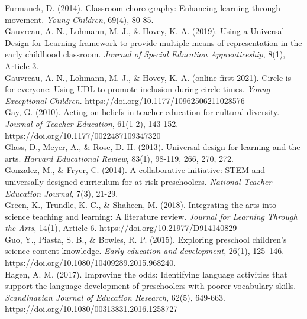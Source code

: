 \documentclass[11.5pt]{sig-alternate}
\begin{document}
Furmanek, D. (2014). Classroom choreography: Enhancing learning through movement. \textit{Young Children}, 69(4), 80-85. 
\\
\newpage
Gauvreau, A. N., Lohmann, M. J., \& Hovey, K. A. (2019). Using a Universal Design for 
Learning framework to provide multiple means of representation in the early childhood classroom. \textit{Journal of Special Education Apprenticeship}, 8(1), Article 3.
\\

Gauvreau, A. N., Lohmann, M. J., \& Hovey, K. A. (online first 2021). Circle is for everyone: 
Using UDL to promote inclusion during circle times. \textit{Young Exceptional Children}. https://doi.org/10.1177/10962506211028576 
\\

Gay, G. (2010). Acting on beliefs in teacher education for cultural diversity. \textit{Journal of 
Teacher Education}, 61(1-2), 143-152. https://doi.org/10.1177/0022487109347320 
\\

Glass, D., Meyer, A., \& Rose, D. H. (2013). Universal design for learning and the arts. \textit{Harvard 
Educational Review}, 83(1), 98-119, 266, 270, 272.
\\

Gonzalez, M., \& Fryer, C. (2014). A collaborative initiative: STEM and universally designed 
curriculum for at-risk preschoolers.\textit{ National Teacher Education Journal}, 7(3), 21-29. 
\\

Green, K., Trundle, K. C., \& Shaheen, M. (2018). Integrating the arts into science teaching and 
learning: A literature review. \textit{Journal for Learning Through the Arts}, 14(1), Article 6. https://doi.org/10.21977/D914140829 
\\

Guo, Y., Piasta, S. B., \& Bowles, R. P. (2015). Exploring preschool children's science content 
knowledge. \textit{Early education and development}, 26(1), 125–146.\\ https://doi.org/10.1080/10409289.2015.968240. 
\\

Hagen, A. M. (2017). Improving the odds: Identifying language activities that support the 
language development of preschoolers with poorer vocabulary skills. \textit{Scandinavian Journal of Education Research}, 62(5), 649-663. https://doi.org/10.1080/00313831.2016.1258727 
\\
\end{document}
